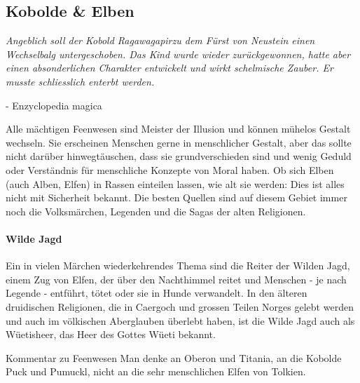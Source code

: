 \documentclass[12pt,twoside,twocolumn,openany]{book}
\begin{document}
\subsection{Kobolde \& Elben}
\begin{quotebox}
	\textit{Angeblich soll der Kobold Ragawagapirzu dem Fürst von Neustein einen Wechselbalg untergeschoben. Das Kind wurde wieder zurückgewonnen, hatte aber einen absonderlichen Charakter entwickelt und wirkt schelmische Zauber. Er musste schliesslich enterbt werden.}
	\begin{flushright}
		- Enzyclopedia magica
	\end{flushright}
\end{quotebox}

Alle mächtigen Feenwesen sind Meister der Illusion und können mühelos Gestalt wechseln. Sie erscheinen Menschen gerne in menschlicher Gestalt, aber das sollte nicht darüber hinwegtäuschen, dass sie grundverschieden sind und wenig Geduld oder Verständnis für menschliche Konzepte von Moral haben. Ob sich Elben (auch Alben, Elfen) in Rassen einteilen lassen, wie alt sie werden: Dies ist alles nicht mit Sicherheit bekannt. Die besten Quellen sind auf diesem Gebiet immer noch die Volksmärchen, Legenden und die Sagas der alten Religionen.

\paragraph{Wilde Jagd} Ein in vielen Märchen wiederkehrendes Thema sind die Reiter der Wilden Jagd, einem Zug von Elfen, der über den Nachthimmel reitet und Menschen - je nach Legende - entführt, tötet oder  sie in Hunde verwandelt. In den älteren druidischen Religionen, die in Caergoch und grossen Teilen Norges gelebt werden und auch im völkischen Aberglauben überlebt haben, ist die Wilde Jagd auch als Wüetisheer, das Heer des Gottes Wüeti bekannt.


\begin{commentbox}{Kommentar zu Feenwesen}
	Man denke an Oberon und Titania, an die Kobolde Puck und Pumuckl, nicht an die sehr menschlichen Elfen von Tolkien.
\end{commentbox}







\end{document}
